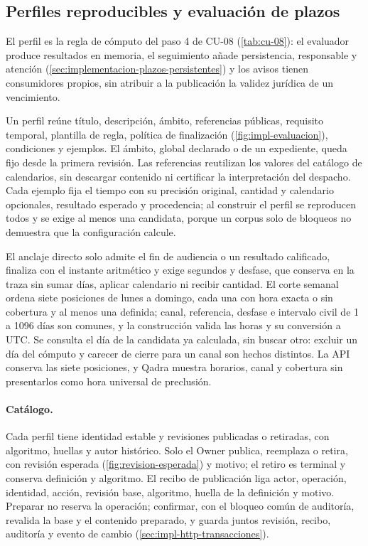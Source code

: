 \subsection{Perfiles reproducibles y evaluación de plazos}\label{sec:implementacion-perfiles-plazos}

El perfil es la regla de cómputo del paso 4 de CU-08 (\cref{tab:cu-08}): el evaluador produce resultados en memoria, el seguimiento añade persistencia, responsable y atención (\cref{sec:implementacion-plazos-persistentes}) y los avisos tienen consumidores propios, sin atribuir a la publicación la validez jurídica de un vencimiento.

Un perfil reúne título, descripción, ámbito, referencias públicas, requisito temporal, plantilla de regla, política de finalización (\cref{fig:impl-evaluacion}), condiciones y ejemplos. El ámbito, global declarado o de un expediente, queda fijo desde la primera revisión. Las referencias reutilizan los valores del catálogo de calendarios, sin descargar contenido ni certificar la interpretación del despacho. Cada ejemplo fija el tiempo con su precisión original, cantidad y calendario opcionales, resultado esperado y procedencia; al construir el perfil se reproducen todos y se exige al menos una candidata, porque un corpus solo de bloqueos no demuestra que la configuración calcule.

El anclaje directo solo admite el fin de audiencia o un resultado calificado, finaliza con el instante aritmético y exige segundos y desfase, que conserva en la traza sin sumar días, aplicar calendario ni recibir cantidad. El corte semanal ordena siete posiciones de lunes a domingo, cada una con hora exacta o sin cobertura y al menos una definida; canal, referencia, desfase e intervalo civil de 1 a 1096 días son comunes, y la construcción valida las horas y su conversión a UTC. Se consulta el día de la candidata ya calculada, sin buscar otro: excluir un día del cómputo y carecer de cierre para un canal son hechos distintos. La API conserva las siete posiciones, y Qadra muestra horarios, canal y cobertura sin presentarlos como hora universal de preclusión.

\paragraph{Catálogo.} Cada perfil tiene identidad estable y revisiones publicadas o retiradas, con algoritmo, huellas y autor histórico. Solo el Owner publica, reemplaza o retira, con revisión esperada (\cref{fig:revision-esperada}) y motivo; el retiro es terminal y conserva definición y algoritmo. El recibo de publicación liga actor, operación, identidad, acción, revisión base, algoritmo, huella de la definición y motivo. Preparar no reserva la operación; confirmar, con el bloqueo común de auditoría, revalida la base y el contenido preparado, y guarda juntos revisión, recibo, auditoría y evento de cambio (\cref{sec:impl-http-transacciones}).

